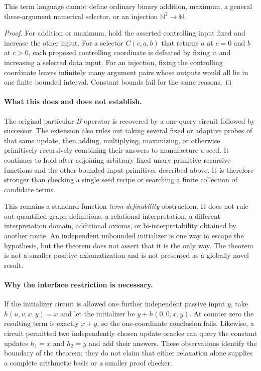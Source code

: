 \begin{corollary}
This term language cannot define ordinary binary addition, maximum, a
general three-argument numerical selector, or an injection
$\mathbb N^2\longrightarrow\mathbb N$.
\end{corollary}
\begin{proof}
For addition or maximum, hold the asserted controlling input fixed and
increase the other input. For a selector $C(c,a,b)$ that returns $a$ at
$c=0$ and $b$ at $c>0$, each proposed controlling coordinate is defeated
by fixing it and increasing a selected data input. For an injection,
fixing the controlling coordinate leaves infinitely many argument pairs
whose outputs would all lie in one finite bounded interval. Constant
bounds fail for the same reasons.
\end{proof}

\paragraph{What this does and does not establish.}
The original particular $B$ operator is recovered by a one-query circuit
followed by successor. The extension also rules out taking several
fixed or adaptive probes of that same update, then adding, multiplying,
maximizing, or otherwise primitively-recursively combining their answers
to manufacture a seed. It continues to hold after adjoining arbitrary
fixed unary primitive-recursive functions and the other bounded-input
primitives described above. It is therefore stronger than checking a
single seed recipe or searching a finite collection of candidate terms.

This remains a standard-function \emph{term-definability} obstruction.
It does not rule out quantified graph definitions, a relational
interpretation, a different interpretation domain, additional axioms, or
bi-interpretability obtained by another route. An independent unbounded
initializer is one way to escape the hypothesis, but the theorem does
not assert that it is the only way. The theorem is not a smaller positive
axiomatization and is not presented as a globally novel result.

\paragraph{Why the interface restriction is necessary.}
If the initializer circuit is allowed one further independent passive
input $y$, take $h(u,v,x,y)=x$ and let the initializer be
$y+h(0,0,x,y)$. At counter zero the resulting term is exactly $x+y$,
so the one-coordinate conclusion fails. Likewise, a circuit permitted
two independently chosen update oracles can query the constant updates
$h_1=x$ and $h_2=y$ and add their answers. These observations identify
the boundary of the theorem; they do not claim that either relaxation
alone supplies a complete arithmetic basis or a smaller proof checker.
